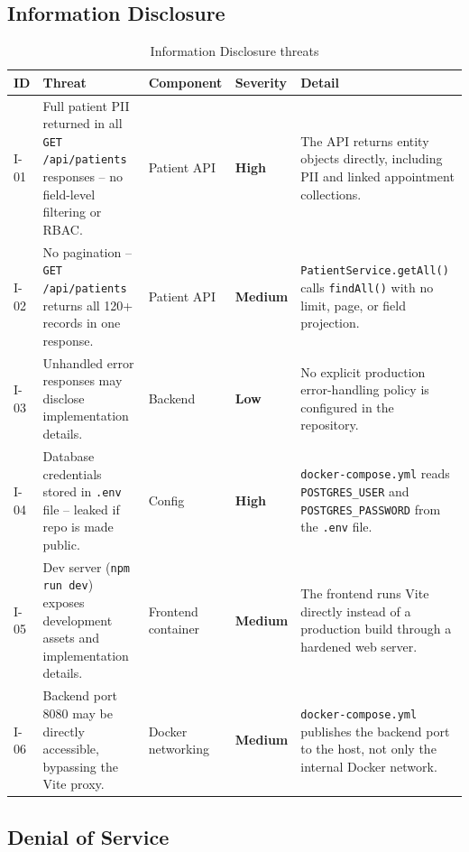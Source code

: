 \documentclass[12pt,a4paper]{report}
\newcommand{\high}{\textbf{\textcolor{sevhigh}{High}}}
\newcommand{\medium}{\textbf{\textcolor{sevmedium}{Medium}}}
\newcommand{\low}{\textbf{\textcolor{sevlow}{Low}}}
\begin{document}
\subsection{Information Disclosure}

\begin{table}[H]
\centering
\caption{Information Disclosure threats}
\begin{tabularx}{\linewidth}{S{0.8cm} S{3.2cm} S{2.4cm} S{2.1cm} X}
\toprule
\textbf{ID} & \textbf{Threat} & \textbf{Component} & \textbf{Severity} & \textbf{Detail} \\
\midrule
I-01 & Full patient PII returned in all \texttt{GET /api/patients} responses -- no field-level filtering or RBAC. & Patient API & \high & The API returns entity objects directly, including PII and linked appointment collections. \\[6pt]
I-02 & No pagination -- \texttt{GET /api/patients} returns all 120+ records in one response. & Patient API & \medium & \texttt{PatientService.getAll()} calls \texttt{findAll()} with no limit, page, or field projection. \\[6pt]
I-03 & Unhandled error responses may disclose implementation details. & Backend & \low & No explicit production error-handling policy is configured in the repository. \\[6pt]
I-04 & Database credentials stored in \texttt{.env} file -- leaked if repo is made public. & Config & \high & \texttt{docker-compose.yml} reads \texttt{POSTGRES\_USER} and \texttt{POSTGRES\_PASSWORD} from the \texttt{.env} file. \\[6pt]
I-05 & Dev server (\texttt{npm run dev}) exposes development assets and implementation details. & Frontend container & \medium & The frontend runs Vite directly instead of a production build through a hardened web server. \\[6pt]
I-06 & Backend port 8080 may be directly accessible, bypassing the Vite proxy. & Docker networking & \medium & \texttt{docker-compose.yml} publishes the backend port to the host, not only the internal Docker network. \\
\bottomrule
\end{tabularx}
\end{table}

\subsection{Denial of Service}
\end{document}
